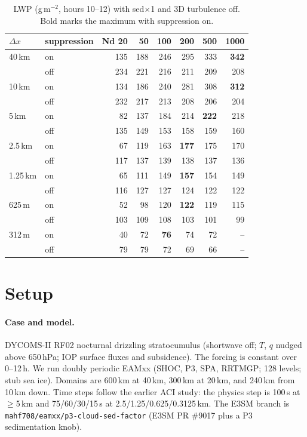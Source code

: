 \documentclass[10pt]{article}
\begin{document}
\begin{table}[H]\centering\small
\caption{LWP (g\,m$^{-2}$, hours 10--12) with sed$\times$1 and 3D turbulence off. Bold marks the maximum with suppression on.}\label{tab:lwp}
\begin{tabular}{@{}llrrrrrr@{}}
\toprule
$\Delta x$ & suppression & Nd 20 & 50 & 100 & 200 & 500 & 1000 \\ \midrule
40\,km & on & 135 & 188 & 246 & 295 & 333 & \textbf{342} \\
 & off & 234 & 221 & 216 & 211 & 209 & 208 \\
10\,km & on & 134 & 186 & 240 & 281 & 308 & \textbf{312} \\
 & off & 232 & 217 & 213 & 208 & 206 & 204 \\
5\,km & on & 82 & 137 & 184 & 214 & \textbf{222} & 218 \\
 & off & 135 & 149 & 153 & 158 & 159 & 160 \\
2.5\,km & on & 67 & 119 & 163 & \textbf{177} & 175 & 170 \\
 & off & 117 & 137 & 139 & 138 & 137 & 136 \\
1.25\,km & on & 65 & 111 & 149 & \textbf{157} & 154 & 149 \\
 & off & 116 & 127 & 127 & 124 & 122 & 122 \\
625\,m & on & 52 & 98 & 120 & \textbf{122} & 119 & 115 \\
 & off & 103 & 109 & 108 & 103 & 101 & 99 \\
312\,m & on & 40 & 72 & \textbf{76} & 74 & 72 & -- \\
 & off & 79 & 79 & 72 & 69 & 66 & -- \\ \bottomrule
\end{tabular}
\end{table}

\section{Setup}
\paragraph{Case and model.} DYCOMS-II RF02 nocturnal drizzling stratocumulus (shortwave off; $T$, $q$ nudged above 650\,hPa; IOP surface fluxes and
subsidence). The forcing is constant over 0--12\,h. We run doubly periodic EAMxx (SHOC, P3, SPA, RRTMGP; 128 levels; stub sea ice).
Domains are 600\,km at 40\,km, 300\,km at 20\,km, and 240\,km from 10\,km down.
Time steps follow the earlier ACI study: the physics step is 100\,s at $\geq$5\,km and 75/60/30/15\,s at 2.5/1.25/0.625/0.3125\,km.
The E3SM branch is \texttt{mahf708/eamxx/p3-cloud-sed-factor} (E3SM PR \#9017 plus a P3 sedimentation knob).
\end{document}
